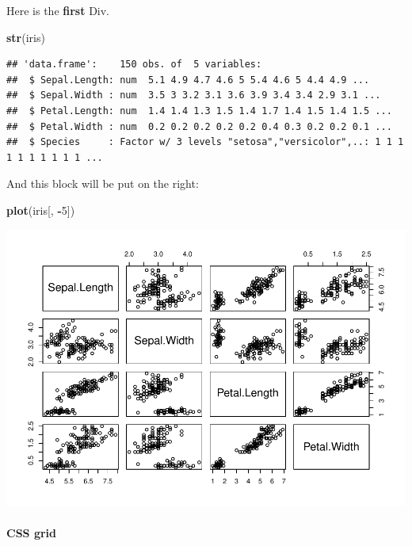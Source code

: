 \documentclass[
]{book}
\newenvironment{Shaded}{\begin{snugshade}}{\end{snugshade}}
\newcommand{\DecValTok}[1]{\textcolor[rgb]{0.00,0.00,0.81}{#1}}
\newcommand{\FunctionTok}[1]{\textcolor[rgb]{0.13,0.29,0.53}{\textbf{#1}}}
\newcommand{\NormalTok}[1]{#1}
\newcommand{\SpecialCharTok}[1]{\textcolor[rgb]{0.81,0.36,0.00}{\textbf{#1}}}
\theoremstyle{definition}
\theoremstyle{definition}
\theoremstyle{definition}
\theoremstyle{definition}
\theoremstyle{remark}
\begin{document}
Here is the \textbf{first} Div.

\begin{Shaded}
\begin{Highlighting}[]
\FunctionTok{str}\NormalTok{(iris)}
\end{Highlighting}
\end{Shaded}

\begin{verbatim}
## 'data.frame':    150 obs. of  5 variables:
##  $ Sepal.Length: num  5.1 4.9 4.7 4.6 5 5.4 4.6 5 4.4 4.9 ...
##  $ Sepal.Width : num  3.5 3 3.2 3.1 3.6 3.9 3.4 3.4 2.9 3.1 ...
##  $ Petal.Length: num  1.4 1.4 1.3 1.5 1.4 1.7 1.4 1.5 1.4 1.5 ...
##  $ Petal.Width : num  0.2 0.2 0.2 0.2 0.2 0.4 0.3 0.2 0.2 0.1 ...
##  $ Species     : Factor w/ 3 levels "setosa","versicolor",..: 1 1 1 1 1 1 1 1 1 1 ...
\end{verbatim}

And this block will be put on the right:

\begin{Shaded}
\begin{Highlighting}[]
\FunctionTok{plot}\NormalTok{(iris[, }\SpecialCharTok{{-}}\DecValTok{5}\NormalTok{])}
\end{Highlighting}
\end{Shaded}

\includegraphics{202401280001-test_files/figure-latex/unnamed-chunk-32-1.pdf}

\hypertarget{css-grid}{%
\paragraph{CSS grid}\label{css-grid}}
\end{document}
